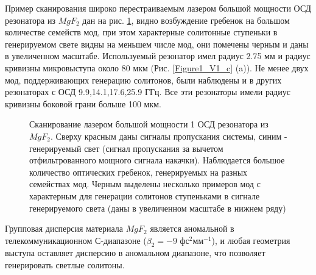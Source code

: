 Пример сканирования широко перестраиваемым лазером большой мощности ОСД резонатора из $MgF_2$ дан на рис. \ref{Scan_SolitonSpot}, видно возбуждение гребенок на большом количестве семейств мод, при этом характерные солитонные ступеньки в генерируемом свете видны на меньшем числе мод, они помечены черным и даны в увеличенном масштабе. Используемый резонатор имел радиус  2.75 мм и радиус кривизны микровыступа около 80 мкм (Рис. \ref{Figure1_V1_c} (a)). Не менее двух мод, поддерживающих генерацию солитонов, были наблюдены и в других резонаторах с ОСД 9.9,14.1,17.6,25.9 ГГц. Все эти резонаторы имели радиус кривизны боковой грани больше 100 мкм.

\begin{figure}[!htb]
\begin{minipage}{1\linewidth}
\end{minipage}
\caption{Сканирование лазером большой мощности 1 ОСД резонатора из $MgF_2$. Сверху красным даны сигналы пропускания системы, синим - генерируемый свет (сигнал пропускания за вычетом отфильтрованного мощного сигнала накачки). Наблюдается большое количество оптических гребенок, генерируемых на разных семействах мод. Черным выделены несколько примеров мод с характерным для генерации солитонов ступеньками в сигнале генерируемого света (даны в увеличенном масштабе в нижнем ряду)}
\label{Scan_SolitonSpot}
\end{figure}

Групповая дисперсия материала $MgF_2$ является аномальной в телекоммуникационном С-диапазоне ($\beta_2=-9$ фс$^2$мм$^{-1}$), и любая геометрия выступа оставляет дисперсию в аномальном диапазоне, что позволяет генерировать светлые солитоны.

